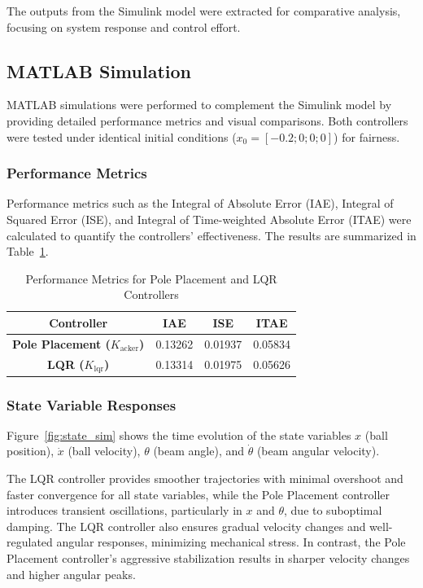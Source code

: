 \documentclass[conference]{IEEEtran}
\begin{document}
The outputs from the Simulink model were extracted for comparative analysis, focusing on system response and control effort.

\subsection{MATLAB Simulation}
\label{subsec:matlab_simulation}

MATLAB simulations were performed to complement the Simulink model by providing detailed performance metrics and visual comparisons. Both controllers were tested under identical initial conditions (\(x_0 = [-0.2; 0; 0; 0]\)) for fairness.

\subsubsection{Performance Metrics}

Performance metrics such as the Integral of Absolute Error (IAE), Integral of Squared Error (ISE), and Integral of Time-weighted Absolute Error (ITAE) were calculated to quantify the controllers' effectiveness. The results are summarized in Table~\ref{tab:performance_metrics}.

\begin{table}[H]
\caption{Performance Metrics for Pole Placement and LQR Controllers}
\label{tab:performance_metrics}
\centering
\begin{tabular}{|c|c|c|c|}
\hline
\textbf{Controller} & \textbf{IAE} & \textbf{ISE} & \textbf{ITAE} \\ \hline
\textbf{Pole Placement (\(K_{\text{acker}}\))} & 0.13262 & 0.01937 & 0.05834 \\ \hline
\textbf{LQR (\(K_{\text{lqr}}\))}             & 0.13314 & 0.01975 & 0.05626 \\ \hline
\end{tabular}
\end{table}

\subsubsection{State Variable Responses}
Figure~\ref{fig:state_sim} shows the time evolution of the state variables \(x\) (ball position), \(\dot{x}\) (ball velocity), \(\theta\) (beam angle), and \(\dot{\theta}\) (beam angular velocity). 

The LQR controller provides smoother trajectories with minimal overshoot and faster convergence for all state variables, while the Pole Placement controller introduces transient oscillations, particularly in \(x\) and \(\theta\), due to suboptimal damping. The LQR controller also ensures gradual velocity changes and well-regulated angular responses, minimizing mechanical stress. In contrast, the Pole Placement controller’s aggressive stabilization results in sharper velocity changes and higher angular peaks. 
\end{document}
